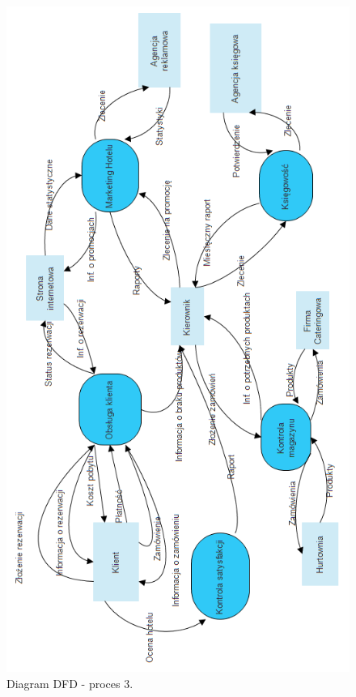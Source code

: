 \documentclass[a4paper, 11pt]{article}
\begin{document}
	\begin{figure}[H]%
			\center
			\includegraphics[scale=0.7]{Img/DFDpoziom0.png}
			\caption{Diagram DFD - proces 3.}
	\end{figure}
\end{document}
